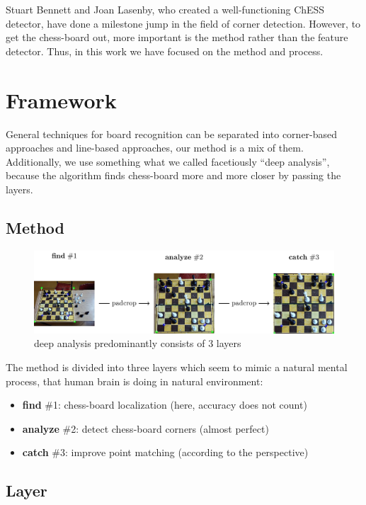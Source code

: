 \documentclass[letterpaper, 12pt]{article}
\begin{document}
Stuart Bennett and Joan Lasenby, who created a well-functioning ChESS detector,
have done a milestone jump in the field of corner detection.
However, to get the chess-board out, more important is the method rather than
the feature detector. Thus, in this work we have focused on the method and process.

\section{Framework}

General techniques for board recognition can be separated into corner-based
approaches and line-based approaches, our method is a mix of them. Additionally,
we use something what we called facetiously
``deep analysis'', because the algorithm finds chess-board more and more closer
by passing the layers.

\subsection{Method}

\begin{figure}[H]
\centering
\includegraphics[width=0.8\columnwidth]{figure2}
\caption{deep analysis predominantly consists of 3 layers}
\end{figure}

The method is divided into three layers which seem to mimic a natural mental
process, that human brain is doing in natural environment:

\begin{itemize}

\item\textbf{find} \#1: chess-board localization (here, accuracy does not count)

\item\textbf{analyze} \#2: detect chess-board corners (almost perfect)

\item\textbf{catch} \#3: improve point matching (according to the perspective)

\end{itemize}

\subsection{Layer}
\end{document}
